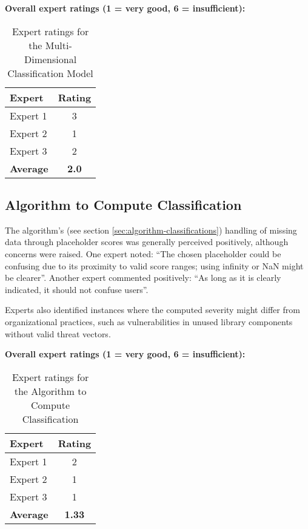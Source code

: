 \textbf{Overall expert ratings (1 = very good, 6 = insufficient):}
\\
\begin{table}[H]
\centering
\begin{tabular}{|l|c|}
    \hline
    Expert & Rating \\
    \hline
    Expert 1 & 3 \\
    Expert 2 & 1 \\
    Expert 3 & 2 \\
    \hline
    \textbf{Average} & \textbf{2.0} \\
    \hline
\end{tabular}
\caption{Expert ratings for the Multi-Dimensional Classification Model}
\label{tab:expert_ratings_multidimensional}
\end{table}

\subsection{Algorithm to Compute Classification}

The algorithm's (see section \ref{sec:algorithm-classifications})  handling of missing data through placeholder scores was generally perceived positively, although concerns were raised. One expert noted: \enquote{The chosen placeholder could be confusing due to its proximity to valid score ranges; using infinity or NaN might be clearer}. Another expert commented positively: \enquote{As long as it is clearly indicated, it should not confuse users}.

Experts also identified instances where the computed severity might differ from organizational practices, such as vulnerabilities in unused library components without valid threat vectors.

\textbf{Overall expert ratings (1 = very good, 6 = insufficient):}
\\
\begin{table}[H]
\centering
\begin{tabular}{|l|c|}
    \hline
    Expert & Rating \\
    \hline
    Expert 1 & 2 \\
    Expert 2 & 1 \\
    Expert 3 & 1 \\
    \hline
    \textbf{Average} & \textbf{1.33} \\
    \hline
\end{tabular}
\caption{Expert ratings for the Algorithm to Compute Classification}
\label{tab:expert_ratings_algorithm_classification}
\end{table}

